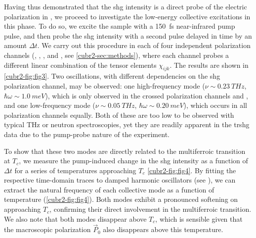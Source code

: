 Having thus demonstrated that the \gls{shg} intensity is a direct probe of the electric polarization in , we proceed to investigate the low-energy collective excitations in this phase.
To do so, we excite the sample with a \qty{150}{fs} near-infrared pump pulse, and then probe the \gls{shg} intensity with a second pulse delayed in time by an amount $\Delta t$.
We carry out this procedure in each of four independent polarization channels (\PP, \PS, \SP, and \SS, see \cref{cubr2-sec:methods}), where each channel probes a different linear combination of the tensor elements $\chi_{ijk}$.
The results are shown in \cref{cubr2-fig:fig3}.
Two oscillations, with different dependencies on the \gls{shg} polarization channel, may be observed: one high-frequency mode ($\nu \sim \qty{0.23}{THz}$, $\hbar \omega \sim \qty{1.0}{meV}$), which is only observed in the crossed polarization channels \PS and \SP, and one low-frequency mode ($\nu \sim \qty{0.05}{THz}$, $\hbar \omega \sim \qty{0.20}{meV}$), which occurs in all polarization channels equally.
Both of these are too low to be observed with typical \si{THz} or neutron spectroscopies, yet they are readily apparent in the \gls{trshg} data due to the pump-probe nature of the experiment.

To show that these two modes are directly related to the multiferroic transition at $T_c$, we measure the pump-induced change in the \gls{shg} intensity as a function of $\Delta t$ for a series of temperatures approaching $T_c$ \cref{cubr2-fig:fig4}.
By fitting the respective time-domain traces to damped harmonic oscillators (see ), we can extract the natural frequency of each collective mode as a function of temperature (\cref{cubr2-fig:fig4}).
Both modes exhibit a pronounced softening on approaching $T_c$, confirming their direct involvement in the multiferroic transition.
We also note that both modes disappear above $T_c$, which is sensible given that the macroscopic polarization $\vec{P}_{0}$ also disappears above this temperature.

